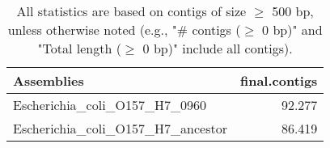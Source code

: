 \documentclass[12pt,a4paper]{article}
\begin{document}
\begin{table}[ht]
\begin{center}
\caption{All statistics are based on contigs of size $\geq$ 500 bp, unless otherwise noted (e.g., "\# contigs ($\geq$ 0 bp)" and "Total length ($\geq$ 0 bp)" include all contigs).}
\begin{tabular}{|l*{1}{|r}|}
\hline
Assemblies & final.contigs \\ \hline
Escherichia\_coli\_O157\_H7\_0960 & 92.277 \\ \hline
Escherichia\_coli\_O157\_H7\_ancestor & 86.419 \\ \hline
\end{tabular}
\end{center}
\end{table}
\end{document}
